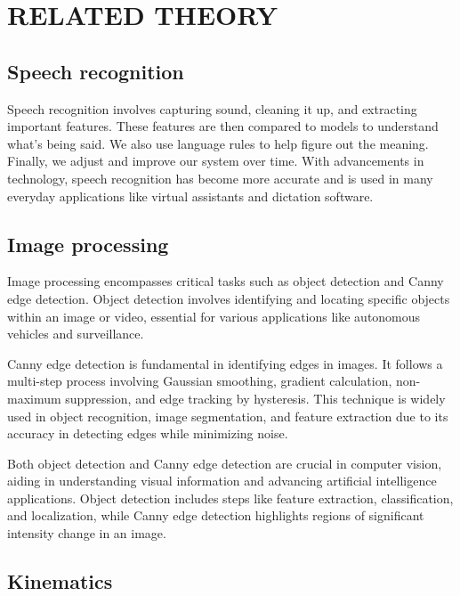 \chapter{RELATED THEORY}
\section{Speech recognition}

Speech recognition involves capturing sound, cleaning it up, and extracting important features. These features are then compared to models to understand what's being said. We also use language rules to help figure out the meaning. Finally, we adjust and improve our system over time. With advancements in technology, speech recognition has become more accurate and is used in many everyday applications like virtual assistants and dictation software.

\section{Image processing}
 
Image processing encompasses critical tasks such as object detection and Canny edge detection. Object detection involves identifying and locating specific objects within an image or video, essential for various applications like autonomous vehicles and surveillance.

Canny edge detection is fundamental in identifying edges in images. It follows a multi-step process involving Gaussian smoothing, gradient calculation, non-maximum suppression, and edge tracking by hysteresis. This technique is widely used in object recognition, image segmentation, and feature extraction due to its accuracy in detecting edges while minimizing noise.

Both object detection and Canny edge detection are crucial in computer vision, aiding in understanding visual information and advancing artificial intelligence applications. Object detection includes steps like feature extraction, classification, and localization, while Canny edge detection highlights regions of significant intensity change in an image.

\section{Kinematics}

